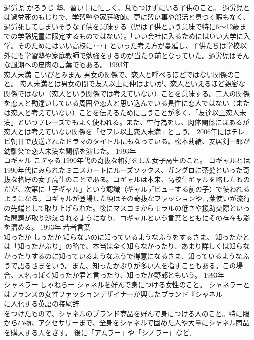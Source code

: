 \documentclass[8pt]{extreport}
\begin{document}
\begin{CJK}{UTF8}{min}
\\	過労児	かろうじ	塾、習い事に忙しく、息もつけずにいる子供のこと。	過労児とは過労死のもじりで、学習塾や家庭教師、更に習い事や部活と息つく暇もなく、過労死してしまいそうな子供を意味する（児は子供という意味で特に6～12歳までの学齢児童に限定するものではない）。「いい会社に入るためにはいい大学に入学。そのためにはいい高校に･･･」といった考え方が蔓延し、子供たちは学校以外にも学習塾や家庭教師で勉強をするのが当たり前となっていた。過労児はそんな風潮への皮肉の言葉でもある。	1993年	
\\	恋人未満	こいびとみまん	男女の関係で、恋人と呼べるほどではない関係のこと。	恋人未満とは男女の間で友人以上に仲はよいが、恋人といえるほど親密な関係ではない（恋人という関係では考えていない）ことを意味する。二人の関係を恋人と勘違いしている周囲や恋人と思い込んでいる異性に恋人ではない（または恋人と考えていない）ことを伝えるために言うことが多く、「友達以上恋人未満」というフレーズでもよく使われる。また、性行為をし、肉体関係にはあるが恋人とは考えていない関係を「セフレ以上恋人未満」と言う。 2006年にはテレビ朝日で放送されたドラマのタイトルにもなっている。松本莉緒、安居剣一郎が幼馴染で恋人未満な関係を演じた。	1993年	
\\	コギャル	こぎゃる	1990年代の奇抜な格好をした女子高生のこと。	コギャルとは1990年代にみられたミニスカートにルーズソックス、ガングロに茶髪といった奇抜な格好の女子高生のことである。コギャルは本来、高校生ギャルを略したものだが、次第に「子ギャル」という認識（ギャルデビューする前の子）で使われるようになる。コギャルが登場した頃はその奇抜なファッションや言葉使いが流行の先端として取り上げられた。後にマスコミからモラルの低さや援助交際といった問題が取り沙汰されるようになり、コギャルという言葉とともにその存在も影を潜める。	1993年	若者言葉	
\\	知ったか	しったか	知らないのに知っているようなふうをするさま。	知ったかとは「知ったかぶり」の略で、本当は全く知らなかったり、あまり詳しくは知らなかったりするのに知っているようなふうで得意になるさま、知っているようなふうで語るさまをいう。また、知ったかぶりが多い人を指すこともある。この場合、人名っぽく知ったか君と言ったり、知ったか野郎ともいう。	1993年	
\\	シャネラー	しゃねらー	シャネルを好んで身につける女性のこと。	シャネラーとはフランスの女性ファッションデザイナーが興したブランド『シャネル
\\	に人化する英語の接尾辞
\\	をつけたもので、シャネルのブランド商品を好んで身につける人のこと。特に服から小物、アクセサリーまで、全身をシャネルで固めた人や大量にシャネル商品を購入する人をさす。 後に「アムラー」や「シノラー」など、

\end{CJK}
\end{document}
